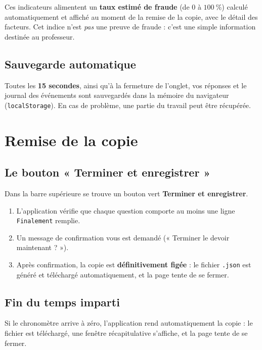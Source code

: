 \documentclass[11pt,a4paper]{article}
\begin{document}
Ces indicateurs alimentent un \textbf{taux estimé de fraude} (de \(0\) à
\(100~\%\)) calculé automatiquement et affiché au moment de la remise de la
copie, avec le détail des facteurs. Cet indice n'est \emph{pas} une preuve
de fraude : c'est une simple information destinée au professeur.

\subsection{Sauvegarde automatique}

Toutes les \textbf{15 secondes}, ainsi qu'à la fermeture de l'onglet, vos
réponses et le journal des événements sont sauvegardés dans la mémoire du
navigateur (\texttt{localStorage}). En cas de problème, une partie du travail
peut être récupérée.

\section{Remise de la copie}

\subsection{Le bouton « Terminer et enregistrer »}

Dans la barre supérieure se trouve un bouton vert \textbf{Terminer et
enregistrer}.

\begin{enumerate}
  \item L'application vérifie que chaque question comporte au moins une ligne
        \texttt{Finalement} remplie.
  \item Un message de confirmation vous est demandé (« Terminer le devoir
        maintenant ? »).
  \item Après confirmation, la copie est \textbf{définitivement figée} :
        le fichier \texttt{.json} est généré et téléchargé automatiquement,
        et la page tente de se fermer.
\end{enumerate}

\subsection{Fin du temps imparti}

Si le chronomètre arrive à zéro, l'application rend automatiquement la copie :
le fichier est téléchargé, une fenêtre récapitulative s'affiche, et la page
tente de se fermer.
\end{document}
